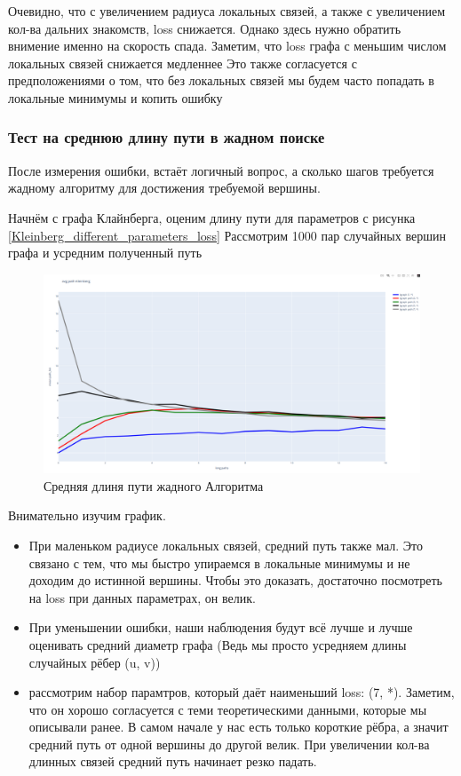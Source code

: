 Очевидно, что с увеличением радиуса локальных связей, а также с увеличением кол-ва 
дальних знакомств, loss снижается. Однако здесь нужно обратить внимение именно на скорость
спада. Заметим, что loss графа с меньшим числом локальных связей снижается медленнее
Это также согласуется с предположениями о том, что без локальных связей мы будем часто
попадать в локальные минимумы и копить ошибку

\subsubsection{Тест на среднюю длину пути в жадном поиске}

После измерения ошибки, встаёт логичный вопрос, а сколько шагов требуется жадному алгоритму для
достижения требуемой вершины. 

Начнём с графа Клайнберга, оценим длину пути для параметров с рисунка \ref{Kleinberg_different_parameters_loss}
Рас\-смотрим 1000 пар случайных вершин графа и усредним полученный путь

\begin{figure}[H]
    \centering
    \includegraphics[scale=0.25]{./pictures/Kleinberg_mean_path_len.png}
    \caption{Средняя длиня пути жадного Алгоритма} \label{Kleinberg_different_parameters_path}
\end{figure}

Внимательно изучим график. 
\begin{itemize}
    \item При маленьком радиусе локальных связей, средний путь также мал. Это связано с тем,
что мы быстро упираемся в локальные минимумы и не доходим до истинной вершины. Чтобы это доказать,
достаточно посмотреть на loss при данных парамет\-рах, он велик.

    \item При уменьшении ошибки, наши наблюдения будут всё лучше и лучше оценивать средний диаметр графа
    (Ведь мы просто усредняем длины случайных рёбер (u, v))

    \item рассмотрим набор парамтров, который даёт наименьший loss: (7, *). Заметим, что 
    он хорошо согласуется с теми теоретическими данными, которые мы описывали ранее. В самом начале у нас есть только 
    короткие рёбра, а значит средний путь от одной вершины до другой велик. При увеличении кол-ва длинных связей 
    средний путь начинает резко падать.
    
\end{itemize}